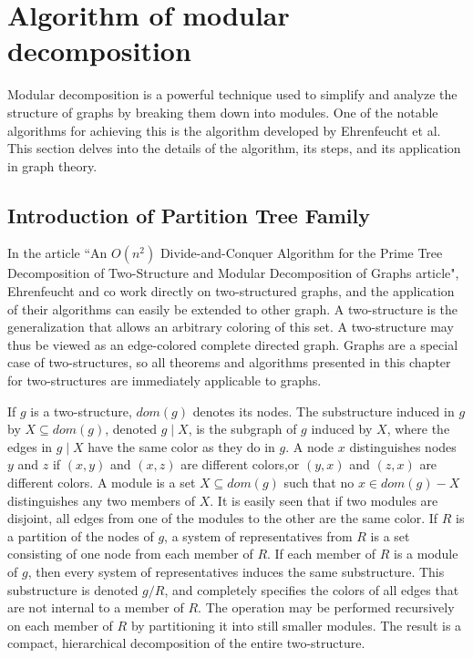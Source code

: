 
\chapter{Algorithm of modular decomposition}\label{ch:algorithm-of-modular-decomposition}

Modular decomposition is a powerful technique used to simplify and analyze the structure of graphs by breaking them down into modules.
One of the notable algorithms for achieving this is the algorithm developed by Ehrenfeucht et al.
This section delves into the details of the algorithm, its steps, and its application in graph theory.

\section{Introduction of Partition Tree Family}\label{sec:introduction-of-partition-tree-family}

In the article ``An $O(n^2)$ Divide-and-Conquer Algorithm for the Prime Tree Decomposition of Two-Structure and Modular Decomposition of Graphs article\cite{PTDMD}", Ehrenfeucht and co work directly on two-structured graphs, and the application of their algorithms can easily be extended to other graph.
A two-structure is the generalization that allows an arbitrary coloring of this set.
A two-structure may thus be viewed as an edge-colored complete directed graph.
Graphs are a special case of two-structures, so all theorems and algorithms presented in this chapter for two-structures are immediately applicable to graphs.


If $g$ is a two-structure, $dom(g)$ denotes its nodes.
The substructure induced in $g$ by $X \subseteq dom(g)$, denoted $g \mid X$, is the subgraph of $g$ induced by $X$, where the edges in $g \mid X$ have the same color as they do in $g$.
A node $x$ distinguishes nodes $y$ and $z$ if $(x, y)$ and $(x, z)$ are different colors,or $(y, x)$ and $(z, x)$ are different colors.
A module is a set $X \subseteq dom(g)$ such that no $x \in dom(g) - X$ distinguishes any two members of $X$.
It is easily seen that if two modules are disjoint, all edges from one of the modules to the other are the same color.
If $R$ is a partition of the nodes of $g$, a system of representatives from $R$ is a set consisting of one node from each member of $R$.
If each member of $R$ is a module of $g$, then every system of representatives induces the same substructure.
This substructure is denoted $g / R$, and completely specifies the colors of all edges that are not internal to a member of $R$.
The operation may be performed recursively on each member of $R$ by partitioning it into still smaller modules.
The result is a compact, hierarchical decomposition of the entire two-structure.

